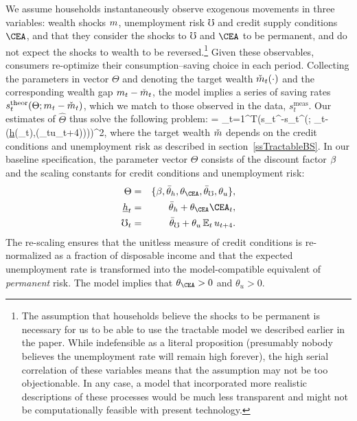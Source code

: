 \documentclass[titlepage]{\econtex}
\DeclareMathOperator*{\argmin}{arg\,min}
\begin{document}
We assume households instantaneously observe exogenous movements in
three variables: wealth shocks $m$, unemployment risk $\mho$ and
credit supply conditions $\CEA$, and that they consider the shocks to
$\mho$ and $\CEA$ to be permanent, and do not expect the shocks to
wealth to be reversed.\footnote{The assumption that households
  believe the shocks to be permanent is necessary for us to be able to
  use the tractable model we described earlier in the paper.  While
  indefensible as a literal proposition (presumably nobody believes
  the unemployment rate will remain high forever), the high serial
  correlation of these variables means that the assumption may not be
  too objectionable.  In any case, a model that incorporated more
  realistic descriptions of these processes would be much less
  transparent and might not be computationally feasible with present
  technology.} Given these observables, consumers
re-optimize their consumption--saving choice in each period. Collecting the parameters in vector
$\Theta$ and denoting the target wealth $\check{m}_t(\cdot)$ and
the corresponding wealth gap $m_t-\check{m}_t$, the model
implies a series of saving rates $s_t^{\text{theor}}(\Theta;
m_t-\check{m}_t)$, which we match to those observed in the data,
$s_t^{\text{meas}}$. Our estimates of $\hat{\Theta}$ thus solve the
following problem: \be \hat{\Theta}=\argmin
\sum_{t=1}^T\bigg(s_{t}^{}-s_t^{}\Big(\Theta;
\mRat_t-\check{\mRat}\big(\underline{h}(\CEA_t),\mho(\Ex_tu_{t+4})\big)\Big)\bigg)^2, \label{minDist}
\ee where the target wealth $\check{m}$ depends on the credit
conditions and unemployment risk as described in
section~\ref{ssTractableBS}. In our baseline specification, the
parameter vector $\Theta$ consists of the discount factor $\beta$
and the scaling constants for credit conditions and unemployment risk:
\begin{eqnarray}
\Theta&=&\{\Discount,\bar{\theta}_h,\theta_\CEA,\bar{\theta}_\mho,\theta_u\},\\
\underline{h}_t&=&\bar{\theta}_h+\theta_\CEA \CEA_t, \\
\mho_t&=&\bar{\theta}_\mho+\theta_u \Ex_tu_{t+4}.
\end{eqnarray}
The re-scaling ensures that the unitless measure of credit conditions is re-normalized as a fraction of disposable income and that the expected unemployment rate is transformed into the model-compatible equivalent of \emph{permanent} risk. The model implies that $\theta_\CEA>0$ and $\theta_u>0$.
\end{document}
